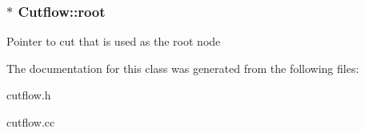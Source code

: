 \subsubsection[{\texorpdfstring{root}{root}}]{$\ast$ Cutflow\+::root\hspace{0.3cm}{\ttfamily [protected]}}\hypertarget{classCutflow_a96f2343bfae77c94f2e87b5f3a128d6d}{}\label{classCutflow_a96f2343bfae77c94f2e87b5f3a128d6d}
Pointer to cut that is used as the root node 

The documentation for this class was generated from the following files\+:\begin{DoxyCompactItemize}
\item 
cutflow.\+h\item 
cutflow.\+cc\end{DoxyCompactItemize}
